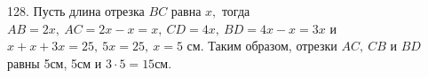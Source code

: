 128. Пусть длина отрезка $BC$ равна $x,$ тогда $AB=2x,\ AC=2x-x=x,\ CD=4x,\ BD=4x-x=3x$ и $x+x+3x=25,\ 5x=25,\ x=5$ см. Таким образом, отрезки $AC,\ CB$ и $BD$ равны 5см, 5см и $3\cdot5=15$см.\\

